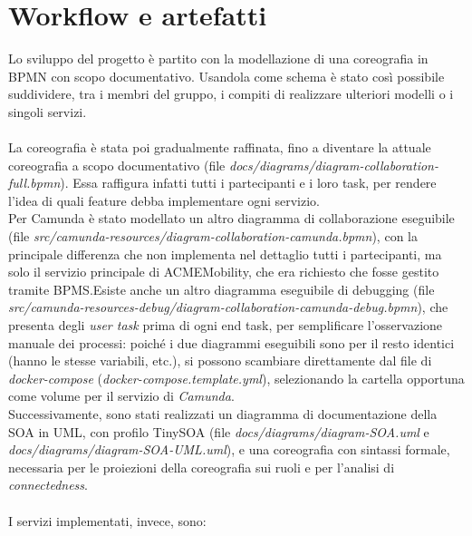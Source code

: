 \section{Workflow e artefatti}\label{sec:workflow}

Lo sviluppo del progetto è partito con la modellazione di una coreografia in
BPMN con scopo documentativo. Usandola come schema è stato così possibile
suddividere, tra i membri del gruppo, i compiti di realizzare ulteriori modelli
o i singoli servizi.\\
\\
La coreografia è stata poi gradualmente raffinata, fino a diventare la attuale
coreografia a scopo documentativo (file
\mbox{\textit{docs/diagrams/diagram-collaboration-full.bpmn}}). Essa raffigura
infatti tutti i partecipanti e i loro task, per rendere l'idea di quali feature
debba implementare ogni servizio.\\
Per Camunda è stato modellato un altro diagramma di collaborazione eseguibile\\
(file \mbox{\textit{src/camunda-resources/diagram-collaboration-camunda.bpmn}}),
con la principale differenza che non implementa nel dettaglio tutti i
partecipanti, ma solo il servizio principale di ACMEMobility, che era richiesto
che fosse gestito tramite BPMS.\@ Esiste anche un altro diagramma eseguibile di
debugging (file
\mbox{\textit{src/camunda-resources-debug/diagram-collaboration-camunda-debug.bpmn}}),
che presenta degli \textit{user task} prima di ogni end task, per semplificare
l'osservazione manuale dei processi: poiché i due diagrammi eseguibili sono per
il resto identici (hanno le stesse variabili, etc.), si possono scambiare
direttamente dal file di \textit{docker-compose}
(\mbox{\textit{docker-compose.template.yml}}), selezionando la cartella
opportuna come volume per il servizio di \textit{Camunda}.\\
Successivamente, sono stati realizzati un diagramma di documentazione della SOA
in UML, con profilo TinySOA (file \mbox{\textit{docs/diagrams/diagram-SOA.uml}}
e \mbox{\textit{docs/diagrams/diagram-SOA-UML.uml}}), e una coreografia con
sintassi formale, necessaria per le proiezioni della coreografia sui ruoli e per
l'analisi di \textit{connectedness}.\\
\\
I servizi implementati, invece, sono:
